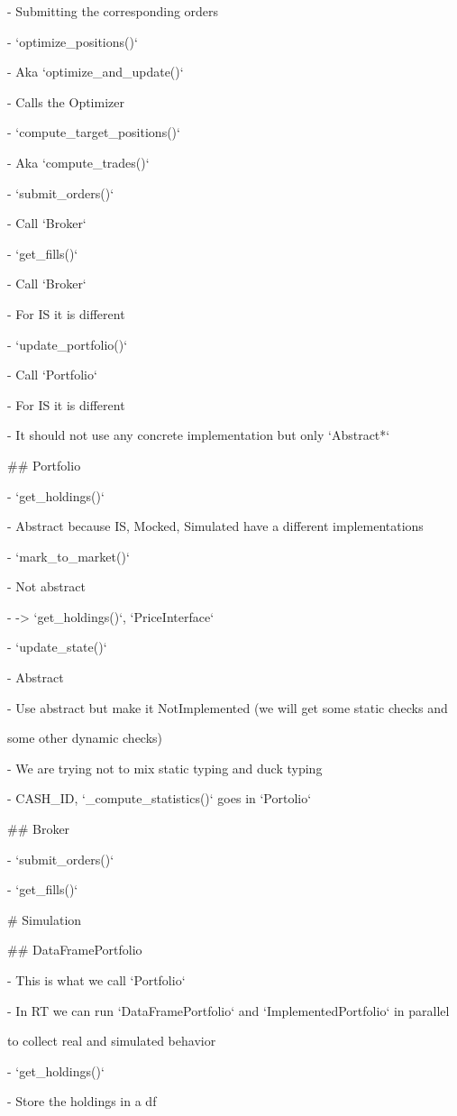 \documentclass[11pt, reqno]{amsart}
\begin{document}
- Submitting the corresponding orders

- `optimize\_positions()`

- Aka `optimize\_and\_update()`

- Calls the Optimizer

- `compute\_target\_positions()`

- Aka `compute\_trades()`

- `submit\_orders()`

- Call `Broker`

- `get\_fills()`

- Call `Broker`

- For IS it is different

- `update\_portfolio()`

- Call `Portfolio`

- For IS it is different

- It should not use any concrete implementation but only `Abstract*`

\#\# Portfolio

- `get\_holdings()`

- Abstract because IS, Mocked, Simulated have a different
implementations

- `mark\_to\_market()`

- Not abstract

- -\textgreater{} `get\_holdings()`, `PriceInterface`

- `update\_state()`

- Abstract

- Use abstract but make it NotImplemented (we will get some static
checks and

some other dynamic checks)

- We are trying not to mix static typing and duck typing

- CASH\_ID, `\_compute\_statistics()` goes in `Portolio`

\#\# Broker

- `submit\_orders()`

- `get\_fills()`

\# Simulation

\#\# DataFramePortfolio

- This is what we call `Portfolio`

- In RT we can run `DataFramePortfolio` and `ImplementedPortfolio` in
parallel

to collect real and simulated behavior

- `get\_holdings()`

- Store the holdings in a df
\end{document}
